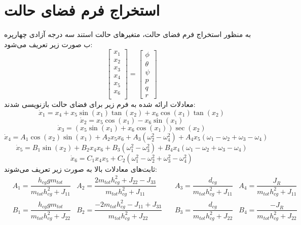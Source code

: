 \section{استخراج فرم فضای حالت}\label{spacestate}
به منظور استخراج فرم فضای حالت، متغیرهای حالت استند سه درجه آزادی چهارپره ب صورت زیر تعریف می‌شود:
\begin{equation}
	\begin{bmatrix}
		x_1\\x_2\\x_3\\x_4\\x_5\\x_6\\
	\end{bmatrix} = 
\begin{bmatrix}
	\phi\\ \theta \\ \psi \\ p\\ q\\ r
\end{bmatrix}
\end{equation}
معادلات ارائه شده به فرم زیر برای فضای حالت بازنویسی شدند:
\begin{equation}
	\dot x_1 = x_4 + x_5\sin(x_1)\tan(x_2) + x_6\cos(x_1)\tan(x_2)
\end{equation}
\begin{equation}
	\dot x_2 = x_5\cos(x_1)- x_6\sin(x_1)
\end{equation}
\begin{equation}
	\dot x_3 = (x_5\sin(x_1) + x_6\cos(x_1))\sec(x_2)
\end{equation}
\begin{equation}
	\dot x_4 = A_1\cos(x_2)\sin(x_1) + 
	A_2x_5x_6 + A_3\left(\omega_2^2-\omega_4^2\right)+
	A_4x_5\left(\omega_1-\omega_2+\omega_3-\omega_4\right)
\end{equation}
\begin{equation}
	\dot x_5 = B_1\sin(x_2) + 
	B_2x_4x_6 + B_3\left(\omega_1^2-\omega_3^2\right)+
	B_4x_4\left(\omega_1-\omega_2+\omega_3-\omega_4\right)
\end{equation}
\begin{equation}
	\dot x_6 = C_1x_4x_5 + 
	C_2\left(\omega_1^2-\omega_2^2+\omega_3^2-\omega_4^2\right)
\end{equation}
ثابت‌های معادلات بالا  به صورت زیر تعریف می‌شوند:
\begin{align*}
	&A_1  = \dfrac{h_{cg}gm_{tot}}{m_{tot}h_{cg}^2+J_{11}}
	&A_2  = \dfrac{2m_{tot}h_{cg}^2+J_{22}-J_{33}}{m_{tot}h_{cg}^2+J_{11}}\quad
	&A_3  = \dfrac{d_{cg}}{m_{tot}h_{cg}^2+J_{11}}
	&A_4  = \dfrac{J_R}{m_{tot}h_{cg}^2+J_{11}}\\
	&B_1  = \dfrac{h_{cg}gm_{tot}}{m_{tot}h_{cg}^2+J_{22}}
	&B_2  = \dfrac{-2m_{tot}h_{cg}^2-J_{11}+J_{33}}{m_{tot}h_{cg}^2+J_{22}}\quad
	&B_3  = \dfrac{d_{cg}}{m_{tot}h_{cg}^2+J_{22}}
	&B_4  = \dfrac{-J_R}{m_{tot}h_{cg}^2+J_{22}}
\end{align*}
